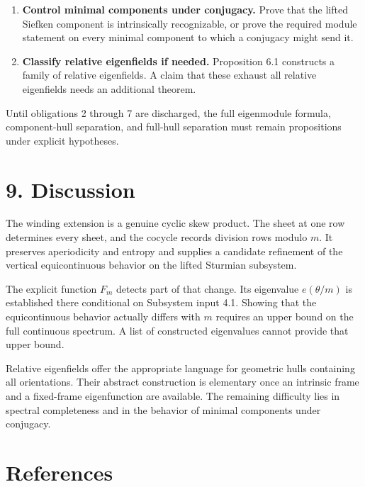 \documentclass[11pt]{article}
\begin{document}
\begin{enumerate}
\item \textbf{Control minimal components under conjugacy.} Prove that the lifted
   Siefken component is intrinsically recognizable, or prove the required
   module statement on every minimal component to which a conjugacy might
   send it.

\item \textbf{Classify relative eigenfields if needed.} Proposition 6.1 constructs a
   family of relative eigenfields. A claim that these exhaust all relative
   eigenfields needs an additional theorem.
\end{enumerate}

Until obligations 2 through 7 are discharged, the full eigenmodule formula,
component-hull separation, and full-hull separation must remain propositions
under explicit hypotheses.

\section*{9. Discussion}

The winding extension is a genuine cyclic skew product. The sheet at one row
determines every sheet, and the cocycle records division rows modulo \(m\).
It preserves aperiodicity and entropy and supplies a candidate refinement of
the vertical equicontinuous behavior on the lifted Sturmian subsystem.

The explicit function \(F_m\) detects part of that change. Its eigenvalue
\(e(\theta/m)\) is established there conditional on Subsystem input 4.1.
Showing that the equicontinuous behavior actually differs with \(m\)
requires an upper bound on the full continuous spectrum. A list of
constructed eigenvalues cannot provide that upper bound.

Relative eigenfields offer the appropriate language for geometric hulls
containing all orientations. Their abstract construction is elementary once
an intrinsic frame and a fixed-frame eigenfunction are available. The
remaining difficulty lies in spectral completeness and in the behavior of
minimal components under conjugacy.

\section*{References}
\end{document}
